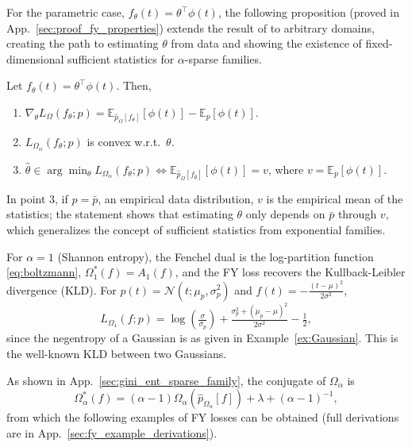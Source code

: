 \documentclass{article}
\begin{document}
{For the parametric case, $f_{\theta}(t) = \theta^{\top}\phi(t)$, the following proposition (proved in App.~\ref{sec:proof_fy_properties}) extends the result of \citet{blondel2020learning} 
to arbitrary domains, creating the path to estimating $\theta$ from data and showing the existence of fixed-dimensional sufficient statistics for $\alpha$-sparse families. 
\vspace{0.05cm}
\begin{proposition}\label{prop:fy_properties}
Let $f_{\theta}(t) = \theta^\top \phi(t)$. Then, 
\vspace{-0.2cm}
\begin{enumerate}[nosep]
\item $\nabla_{\theta} L_{\Omega}(f_\theta; p) = \mathbb{E}_{\hat{p}_{\Omega}[f_\theta]}[\phi(t)] - \mathbb{E}_{p}[\phi(t)]$.
    \item $L_{\Omega_{\alpha}}(f_\theta; p)$ is convex w.r.t.\ $\theta$. 
\item $\hat{\theta} \in \arg\min_{\theta} L_{\Omega_{\alpha}}(f_\theta; p) \Leftrightarrow \mathbb{E}_{\hat{p}_{\Omega}[f_{\hat{\theta}}]}[\phi(t)] = v$,
    where $v = \mathbb{E}_{p}[\phi(t)]$.
\end{enumerate}
\end{proposition}
In point 3, if $p=\bar{p}$, an empirical data distribution, $v$ is the empirical mean of the statistics;  the statement shows that estimating $\theta$ only depends on 
$\bar{p}$ through $v$, which generalizes the concept of sufficient statistics from exponential families.  


\begin{example}\label{ex:fy_gaussians} For $\alpha= 1$ (Shannon entropy), the Fenchel dual is the log-partition function  \eqref{eq:boltzmann}, $\Omega_1^*(f) = A_1(f)$, and the FY loss recovers the  Kullback-Leibler divergence (KLD).  
For $p(t) = \mathcal{N}(t; \mu_p, \sigma_p^2)$ and $f(t) = -\frac{(t-\mu)^2}{2\sigma^2}$, 
\begin{equation}\label{eq:kl_gaussians}
L_{\Omega_1}(f; p) = \log\left(\tfrac{\sigma}{\sigma_p}\right) + \tfrac{\sigma_p^2 + (\mu_p - \mu)^2}{2\sigma^2} - \tfrac{1}{2},
\end{equation}
since the negentropy of a Gaussian is as given in Example~\ref{ex:Gaussian}. This is the well-known KLD between two Gaussians.
\end{example}






As shown in App.~\ref{sec:gini_ent_sparse_family}, 
the conjugate of $\Omega_\alpha$ is
\begin{equation}\label{eq:omega_conjugate}
\Omega_\alpha^*(f) = (\alpha-1)\Omega_{\alpha}(\hat{p}_{\Omega_\alpha}[f]) + \lambda + (\alpha-1)^{-1},
\end{equation}
from which the following examples of FY losses can be obtained (full derivations are in App.~\ref{sec:fy_example_derivations}).



}
\end{document}
